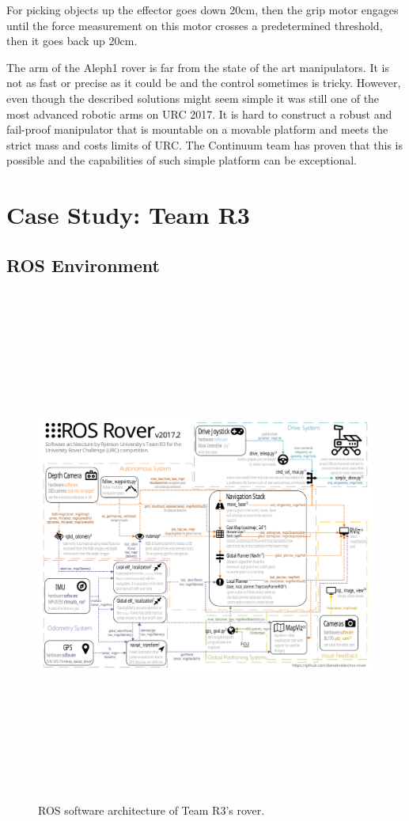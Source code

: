 \documentclass[runningheads,a4paper]{llncs}
\begin{document}
For picking objects up the effector goes down 20cm, then the grip motor engages until the force measurement on this motor crosses a predetermined threshold, then it goes back up 20cm.

The arm of the Aleph1 rover is far from the state of the art manipulators. It is not as fast or precise as it could be and the control sometimes is tricky. However, even though the described solutions might seem simple it was still one of the most advanced robotic arms on URC 2017. It is hard to construct a robust and fail-proof manipulator that is mountable on a movable platform and meets the strict mass and costs limits of URC. The Continuum team has proven that this is possible and the capabilities of such simple platform can be exceptional.

\section{Case Study: Team R3}\label{r3case}
\subsection{ROS Environment}\label{ROS Environment}

\begin{figure}
\centering
\includegraphics[height=17cm]{Rover_Diagrampdf}
\caption{ROS software architecture of Team R3's rover.}
\label{fig:Diagram}
\end{figure}
\end{document}

